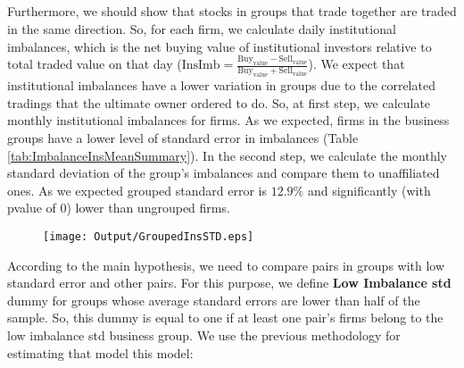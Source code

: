 \FloatBarrier





\subsection{}
\begin{LTR}
	Furthermore, we should show that stocks in groups that trade together are traded in the same direction. So, for each firm, we calculate daily institutional imbalances, which is the net buying value of institutional investors relative to total traded value on that day ($ \text{InsImb} = \frac{\text{Buy}_{\text{value}} - \text{Sell}_{\text{value}}}{\text{Buy}_{\text{value}} + \text{Sell}_{\text{value}}} $).\cite{seasholes2007predictable} 
	We expect that institutional imbalances have a lower variation in groups due to the correlated tradings that the ultimate owner ordered to do. So, at first step, we calculate monthly institutional imbalances for firms. As we expected, firms in the business groups have a lower level of standard error in  imbalances (Table \ref{tab:ImbalanceInsMeanSummary}). In the second step, 	 we calculate the monthly standard deviation of the group's imbalances and compare them to unaffiliated ones. As we expected grouped standard error is  $12.9\%$ and significantly (with pvalue of 0) lower than ungrouped firms. 
	
	\begin{figure}[htbp]
		\centering
		\texttt{[image: Output/GroupedInsSTD.eps]}
		\label{fig:GroupedInsSTD}
	\end{figure}
	
	According to the main hypothesis, we need to compare pairs in groups with low standard error and other pairs.
	For this purpose, we define \textbf{Low Imbalance std} dummy for groups whose average standard errors are lower than half of the sample. 
	So, this dummy is equal to one if at least one pair's firms belong to the low imbalance std business group.  We use the previous methodology for estimating that model this model:
	
	

\end{LTR}
